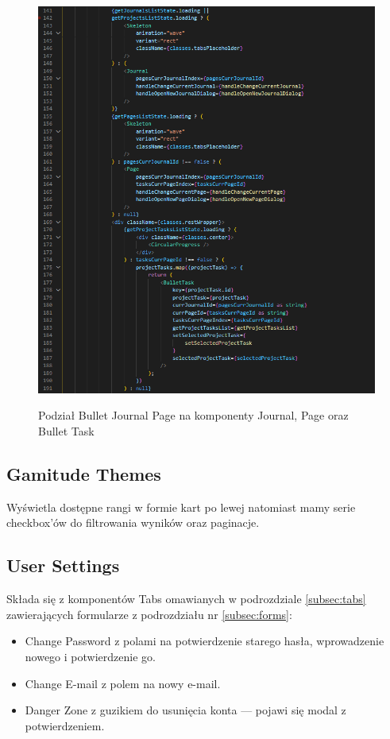 \documentclass[a4paper,11pt]{report}
\begin{document}
\begin{figure}[H]
	\centering
	\includegraphics[scale=0.7]{implementacja/frontend/bullet_journal_division}\\
	\caption{Podział Bullet Journal Page na komponenty Journal, Page oraz Bullet Task}
	\label{fig:bullet_division}
\end{figure}

\subsection{Gamitude Themes}
Wyświetla dostępne rangi w formie kart po lewej natomiast mamy serie checkbox'ów do filtrowania wyników oraz paginacje.

\subsection{User Settings}
Składa się z komponentów Tabs omawianych w podrozdziale \ref{subsec:tabs} zawierających formularze z podrozdziału nr \ref{subsec:forms}:
\begin{itemize}
	\item Change Password z polami na potwierdzenie starego hasła, wprowadzenie nowego i potwierdzenie go.
	\item Change E-mail z polem na nowy e-mail.
	\item Danger Zone z guzikiem do usunięcia konta — pojawi się modal z potwierdzeniem.
\end{itemize}
\end{document}
